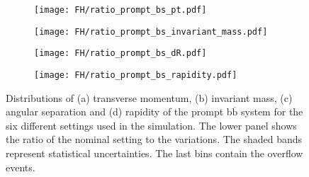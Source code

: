 \begin{figure}[H]
    \centering
    \begin{subfigure}{0.49\textwidth}
        \centering
        \texttt{[image: FH/ratio\_prompt\_bs\_pt.pdf]}
        \caption{}
        \label{app:subfig:pt(bbbar_prompt)_FH}
    \end{subfigure}
    \begin{subfigure}{0.49\textwidth}
        \centering
        \texttt{[image: FH/ratio\_prompt\_bs\_invariant\_mass.pdf]}
        \caption{}
        \label{app:subfig:m(bbbar_prompt)_FH}
    \end{subfigure}

    \vspace{0.2cm}
    
    \begin{subfigure}{0.49\textwidth}
        \centering
        \texttt{[image: FH/ratio\_prompt\_bs\_dR.pdf]}
        \caption{}
        \label{app:subfig:dR(bbbar_prompt)_FH}
    \end{subfigure}
    \begin{subfigure}{0.49\textwidth}
        \centering
        \texttt{[image: FH/ratio\_prompt\_bs\_rapidity.pdf]}
        \caption{}
        \label{app:subfig:y(bbbar_prompt)_FH}
    \end{subfigure}
    \caption{Distributions of (a) transverse momentum, (b) invariant mass,  (c) angular separation and (d) rapidity of the prompt b$\overline{\text{b}}$ system for the six different settings used in the simulation. The lower panel shows the ratio of the nominal setting to the variations. The shaded bands represent statistical uncertainties. The last bins contain the overflow events.}
    \label{app:fig:prompt_bbbar_FH}
\end{figure}

